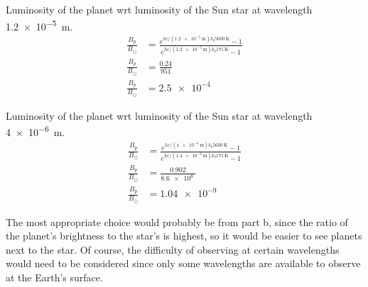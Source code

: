 \documentclass{homework}
\begin{document}
Luminosity of the planet wrt luminosity of the Sun star at wavelength \SI{1.2e-5}{\metre}.
\begin{align*}
    \frac{B_p}{B_\odot} &=	\frac{e^{hc/(\SI{1.2e-5}{\metre})k_b \SI{5600}{\kelvin}}-1}{e^{hc/(\SI{1.2e-5}{\metre})k_b \SI{175}{\kelvin}}-1}	\\
    \frac{B_p}{B_\odot}    &=	\frac{0.24}{951}	\\
    \frac{B_p}{B_\odot} &=  \boxed{\SI{2.5e-4}{}}
\end{align*}

Luminosity of the planet wrt luminosity of the Sun star at wavelength \SI{4e-6}{\metre}.
\begin{align*}
    \frac{B_p}{B_\odot} &=	\frac{e^{hc/(\SI{4e-6}{\metre})k_b \SI{5600}{\kelvin}}-1}{e^{hc/(\SI{1.4e-6}{\metre})k_b \SI{175}{\kelvin}}-1}	\\
    \frac{B_p}{B_\odot}    &=	\frac{0.902}{\SI{8.6e8}{}}	\\
    \frac{B_p}{B_\odot} &=  \boxed{\SI{1.04e-9}{}}
\end{align*}

The most appropriate choice would probably be from part b, since the ratio of the planet's brightness to the star's is highest, so it would be easier to see planets next to the star. Of course, the difficulty of observing at certain wavelengths would need to be considered since only some wavelengths are available to observe at the Earth's surface.
\end{document}
